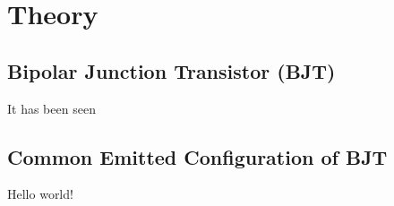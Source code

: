 \section{Theory}


\subsection{Bipolar Junction Transistor (BJT)}
It has been seen
\subsection{Common Emitted Configuration of BJT}

Hello world!